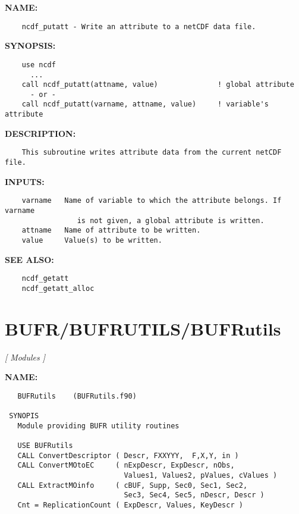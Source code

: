 \label{ch:robo2}
\label{ch:Attributes_ncdf_putatt}
\textbf{NAME:}\hspace{0.08in}\begin{Verbatim}
    ncdf_putatt - Write an attribute to a netCDF data file.
\end{Verbatim}
\textbf{SYNOPSIS:}\hspace{0.08in}\begin{Verbatim}
    use ncdf
      ...
    call ncdf_putatt(attname, value)              ! global attribute
      - or -
    call ncdf_putatt(varname, attname, value)     ! variable's attribute
\end{Verbatim}
\textbf{DESCRIPTION:}\hspace{0.08in}\begin{Verbatim}
    This subroutine writes attribute data from the current netCDF file.
\end{Verbatim}
\textbf{INPUTS:}\hspace{0.08in}\begin{Verbatim}
    varname   Name of variable to which the attribute belongs. If varname
                 is not given, a global attribute is written.
    attname   Name of attribute to be written.
    value     Value(s) to be written.
\end{Verbatim}
\textbf{SEE ALSO:}\hspace{0.08in}\begin{Verbatim}
    ncdf_getatt
    ncdf_getatt_alloc
\end{Verbatim}
\section{BUFR/BUFRUTILS/BUFRutils}
\textsl{[ Modules ]}

\label{ch:robo3}
\label{ch:BUFR_BUFRUTILS_BUFRutils}
\textbf{NAME:}\hspace{0.08in}\begin{Verbatim}
   BUFRutils    (BUFRutils.f90)

 SYNOPIS
   Module providing BUFR utility routines

   USE BUFRutils
   CALL ConvertDescriptor ( Descr, FXXYYY,  F,X,Y, in )
   CALL ConvertMOtoEC     ( nExpDescr, ExpDescr, nObs,
                            Values1, Values2, pValues, cValues )
   CALL ExtractMOinfo     ( cBUF, Supp, Sec0, Sec1, Sec2,
                            Sec3, Sec4, Sec5, nDescr, Descr )
   Cnt = ReplicationCount ( ExpDescr, Values, KeyDescr )
\end{Verbatim}
